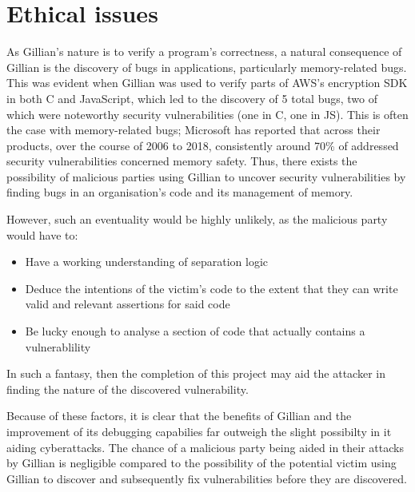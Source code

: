 \chapter{Ethical issues}

As Gillian's nature is to verify a program's correctness, a natural consequence of Gillian is the discovery of bugs in applications, particularly memory-related bugs.
This was evident when Gillian was used to verify parts of AWS's encryption SDK in both C and JavaScript, which led to the discovery of 5 total bugs, two of which were noteworthy security vulnerabilities (one in C, one in JS)\cite{gillian-part2}.
This is often the case with memory-related bugs; Microsoft has reported that across their products, over the course of 2006 to 2018, consistently around 70\% of addressed security vulnerabilities concerned memory safety\cite{microsoft-memory-bugs}.
Thus, there exists the possibility of malicious parties using Gillian to uncover security vulnerabilities by finding bugs in an organisation's code and its management of memory.

However, such an eventuality would be highly unlikely, as the malicious party would have to:
\begin{itemize}
  \item Have a working understanding of separation logic
  \item Deduce the intentions of the victim's code to the extent that they can write valid and relevant assertions for said code
  \item Be lucky enough to analyse a section of code that actually contains a vulnerablility
\end{itemize}

In such a fantasy, then the completion of this project may aid the attacker in finding the nature of the discovered vulnerability.

Because of these factors, it is clear that the benefits of Gillian and the improvement of its debugging capabilies far outweigh the slight possibilty in it aiding cyberattacks.
The chance of a malicious party being aided in their attacks by Gillian is negligible compared to the possibility of the potential victim using Gillian to discover and subsequently fix vulnerabilities before they are discovered.
